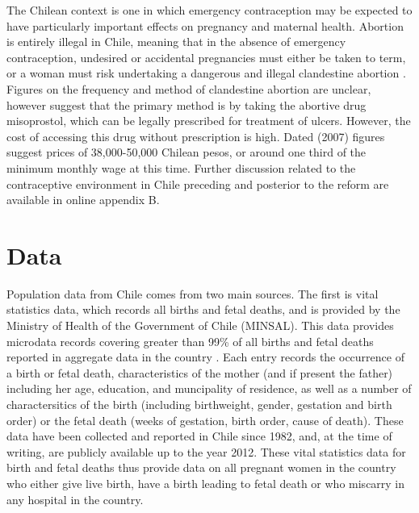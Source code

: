 The Chilean context is one in which emergency contraception may be expected to
have particularly important effects on pregnancy and maternal health.  Abortion
is entirely illegal in Chile, meaning that in the absence of emergency 
contraception, undesired or accidental pregnancies must either be taken to 
term, or a woman must risk undertaking a dangerous and illegal clandestine
abortion \citep{ShepardCasas2007}.  Figures on the frequency and method of 
clandestine abortion are unclear, however \citet{ShepardCasas2007} suggest that
the primary method is by taking the abortive drug misoprostol, which can be
legally prescribed for treatment of ulcers.  However, the cost of accessing 
this drug without prescription is high.  Dated (2007) figures suggest prices
of 38,000-50,000 Chilean pesos, or around one third of the minimum monthly wage
at this time.  Further discussion related to the contraceptive environment in 
Chile preceding and posterior to the reform are available in online appendix B.  

\section{Data}
\label{TEENscn:Data}
Population data from Chile comes from two main sources. The first is vital 
statistics data, which records all births and fetal deaths, and is provided by 
the Ministry of Health of the Government of Chile (MINSAL). This data provides 
microdata records covering greater than 99\% of all births and fetal deaths 
reported in aggregate data in the country \citep{Bharadwajetal2013}. Each entry 
records the occurrence of a birth or fetal death, characteristics of the mother 
(and if present the father) including her age, education, and muncipality of 
residence, as well as a number of charactersitics of the birth (including 
birthweight, gender, gestation and birth order) or the fetal death (weeks of 
gestation, birth order, cause of death). These data have been collected and 
reported in Chile since 1982, and, at the time of writing, are publicly 
available up to the year 2012. These vital statistics data for birth and
fetal deaths thus provide data on all pregnant women in the country who either 
give live birth, have a birth leading to fetal death or who miscarry in any 
hospital in the country.

